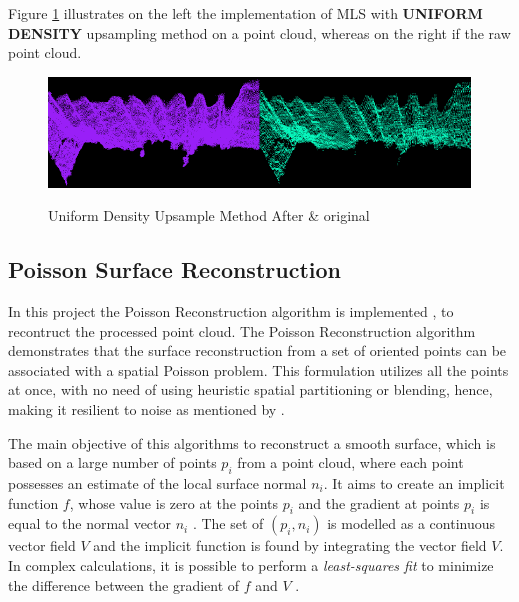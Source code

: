 \documentclass[12pt]{report}
\begin{document}
Figure \ref{fig:sUpsample_def} illustrates on the left the implementation of MLS with \textbf{UNIFORM DENSITY} upsampling method on a point cloud, whereas on the right if the raw point cloud.

\begin{figure}[H]%
  \centering
  \includegraphics[width=1\textwidth]{upsample_def.png}
 \caption{Uniform Density Upsample Method After \& original}\cite[]{ichim_2012}
 \label{fig:sUpsample_def} 
\end{figure}







\newpage
\subsection{Poisson Surface Reconstruction}
\label{section:Poisson Surface Reconstruction}
In this project the Poisson Reconstruction algorithm is implemented , to recontruct the processed point cloud.
The Poisson Reconstruction algorithm demonstrates that the surface reconstruction from a set of oriented points can be associated with a spatial Poisson problem.
This formulation utilizes all the points at once, with no need of using heuristic spatial partitioning or blending, hence, making it resilient to noise as mentioned by .

The main objective of this algorithms to reconstruct a smooth surface, which is based on a large number of points $p_i$ from a point cloud, where each point possesses an estimate of the local surface normal $n_i$.
It aims to create an implicit function $f$, whose value is zero at the points $p_i$ and the gradient at points $p_i$ is equal to the normal vector $n_i$ .
The set of $(p_i,n_i)$ is modelled as a continuous vector field $V$ and the implicit function is found by integrating the vector field $V$.
In complex calculations, it is possible to perform a \textit{least-squares fit} to minimize the difference between the gradient of $f$ and $V$ .
\end{document}
